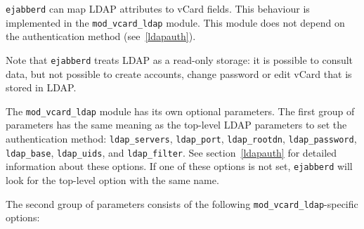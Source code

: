 \documentclass[a4paper,10pt]{book}
\newcommand{\option}[1]{\texttt{#1}}
\newcommand{\ejabberd}{\texttt{ejabberd}}
\newcommand{\module}[1]{\texttt{#1}}
\newcommand{\modvcardldap}{\module{mod\_vcard\_ldap}}
\begin{document}

\ejabberd{} can map LDAP attributes to vCard fields. This behaviour is
implemented in the \modvcardldap{} module. This module does not depend on the
authentication method (see~\ref{ldapauth}).

Note that \ejabberd{} treats LDAP as a read-only storage:
it is possible to consult data, but not possible to
create accounts, change password or edit vCard that is stored in LDAP.

The \modvcardldap{} module has
its own optional parameters. The first group of parameters has the same
meaning as the top-level LDAP parameters to set the authentication method:
\option{ldap\_servers}, \option{ldap\_port}, \option{ldap\_rootdn},
\option{ldap\_password}, \option{ldap\_base}, \option{ldap\_uids}, and
\option{ldap\_filter}. See section~\ref{ldapauth} for detailed information
about these options. If one of these options is not set, \ejabberd{} will look
for the top-level option with the same name.

The second group of parameters
consists of the following \modvcardldap{}-specific options:
\end{document}
